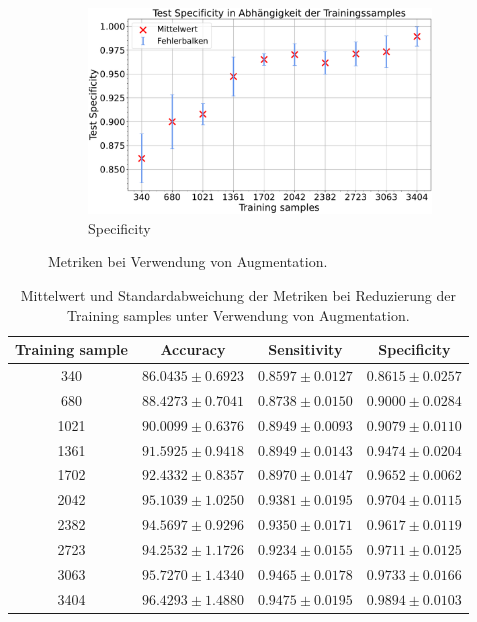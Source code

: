 \begin{figure}[H]
\begin{subfigure}[b]{0.48\textwidth}
  \end{subfigure}
  \begin{subfigure}[b]{0.48\textwidth}
    \includegraphics[width=\textwidth]{plots/Augm-Messungen-noTu-Tu_Specificity_mean.pdf}
    \caption{Specificity}
    \label{fig:augmentation_specificity}
  \end{subfigure}
  \caption{Metriken bei Verwendung von Augmentation.}
  \label{fig:augmentation_tu}
\end{figure}
\begin{table}[H]
    \centering
        \begin{tabular}{cccc}
            \toprule
            Training sample & Accuracy & Sensitivity & Specificity\\
            \midrule
            340  & $86.0435 \pm 0.6923$ & $0.8597 \pm 0.0127$ & $0.8615 \pm 0.0257$\\
            680  & $88.4273 \pm 0.7041$ & $0.8738 \pm 0.0150$ & $0.9000 \pm 0.0284$\\
            1021 & $90.0099 \pm 0.6376$ & $0.8949 \pm 0.0093$ & $0.9079 \pm 0.0110$\\
            1361 & $91.5925 \pm 0.9418$ & $0.8949 \pm 0.0143$ & $0.9474 \pm 0.0204$\\
            1702 & $92.4332 \pm 0.8357$ & $0.8970 \pm 0.0147$ & $0.9652 \pm 0.0062$\\
            2042 & $95.1039 \pm 1.0250$ & $0.9381 \pm 0.0195$ & $0.9704 \pm 0.0115$\\
            2382 & $94.5697 \pm 0.9296$ & $0.9350 \pm 0.0171$ & $0.9617 \pm 0.0119$\\
            2723 & $94.2532 \pm 1.1726$ & $0.9234 \pm 0.0155$ & $0.9711 \pm 0.0125$\\
            3063 & $95.7270 \pm 1.4340$ & $0.9465 \pm 0.0178$ & $0.9733 \pm 0.0166$\\
            3404 & $96.4293 \pm 1.4880$ & $0.9475 \pm 0.0195$ & $0.9894 \pm 0.0103$\\
            \bottomrule
        \end{tabular}
  \caption{Mittelwert und Standardabweichung der Metriken bei Reduzierung der Training samples unter Verwendung von Augmentation.}
  \label{tab:augm-tunotu}
\end{table}

